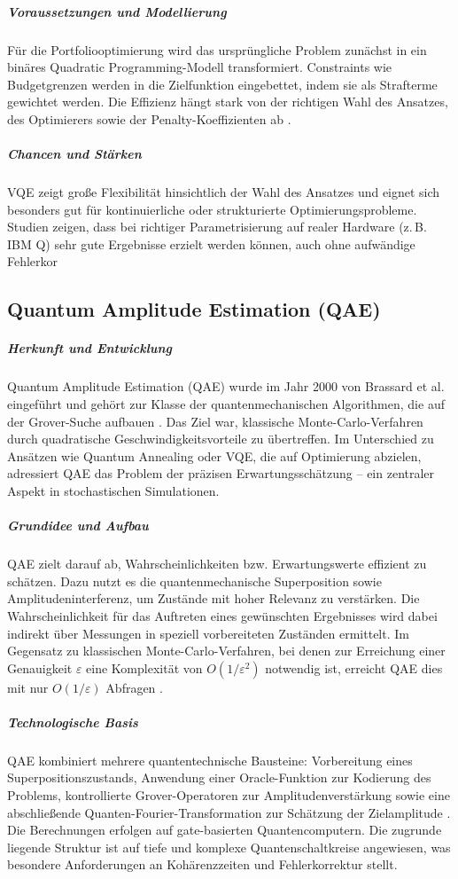 \subparagraph{Voraussetzungen und Modellierung}
Für die Portfoliooptimierung wird das ursprüngliche Problem zunächst in ein binäres Quadratic Programming-Modell transformiert. Constraints wie Budgetgrenzen werden in die Zielfunktion eingebettet, indem sie als Strafterme gewichtet werden. Die Effizienz hängt stark von der richtigen Wahl des Ansatzes, des Optimierers sowie der Penalty-Koeffizienten ab \cite{buonaiuto_best_2023}.

\subparagraph{Chancen und Stärken}
VQE zeigt große Flexibilität hinsichtlich der Wahl des Ansatzes und eignet sich besonders gut für kontinuierliche oder strukturierte Optimierungsprobleme. Studien zeigen, dass bei richtiger Parametrisierung auf realer Hardware (z.\,B. IBM Q) sehr gute Ergebnisse erzielt werden können, auch ohne aufwändige Fehlerkor


\subsection{Quantum Amplitude Estimation (QAE)}

\subparagraph{Herkunft und Entwicklung}
Quantum Amplitude Estimation (QAE) wurde im Jahr 2000 von Brassard et al. eingeführt und gehört zur Klasse der quantenmechanischen Algorithmen, die auf der Grover-Suche aufbauen \cite{quantumjournal2020}. Das Ziel war, klassische Monte-Carlo-Verfahren durch quadratische Geschwindigkeitsvorteile zu übertreffen. Im Unterschied zu Ansätzen wie Quantum Annealing oder VQE, die auf Optimierung abzielen, adressiert QAE das Problem der präzisen Erwartungsschätzung – ein zentraler Aspekt in stochastischen Simulationen.

\subparagraph{Grundidee und Aufbau}
QAE zielt darauf ab, Wahrscheinlichkeiten bzw. Erwartungswerte effizient zu schätzen. Dazu nutzt es die quantenmechanische Superposition sowie Amplitudeninterferenz, um Zustände mit hoher Relevanz zu verstärken. Die Wahrscheinlichkeit für das Auftreten eines gewünschten Ergebnisses wird dabei indirekt über Messungen in speziell vorbereiteten Zuständen ermittelt. Im Gegensatz zu klassischen Monte-Carlo-Verfahren, bei denen zur Erreichung einer Genauigkeit $\varepsilon$ eine Komplexität von $O(1/\varepsilon^2)$ notwendig ist, erreicht QAE dies mit nur $O(1/\varepsilon)$ Abfragen \cite{quantumjournal2020, rebentrost2018}.

\subparagraph{Technologische Basis}
QAE kombiniert mehrere quantentechnische Bausteine: Vorbereitung eines Superpositionszustands, Anwendung einer Oracle-Funktion zur Kodierung des Problems, kontrollierte Grover-Operatoren zur Amplitudenverstärkung sowie eine abschließende Quanten-Fourier-Transformation zur Schätzung der Zielamplitude \cite{martin2022}. Die Berechnungen erfolgen auf gate-basierten Quantencomputern. Die zugrunde liegende Struktur ist auf tiefe und komplexe Quantenschaltkreise angewiesen, was besondere Anforderungen an Kohärenzzeiten und Fehlerkorrektur stellt.

